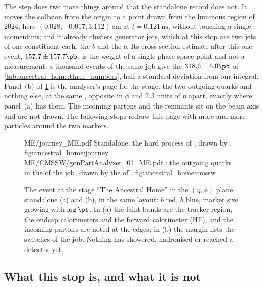 The  step does two more things around \PYTHIA that the
standalone record does not. It moves the collision from the origin to a
point drawn from the luminous region of 2024, here
$(0.028,-0.017,3.112)\,\mathrm{cm}$ at $t=0.121\,\mathrm{ns}$, without
touching a single momentum; and it already clusters generator jets, which
at this stop are two jets of one constituent each, the $b$ and the
$\bar b$. Its cross-section estimate after this one event,
$157.7\pm157.7\pb$, is the weight of a single phase-space point and not a
measurement; a thousand events of the same job give the $348.6\pm6.0\pb$
of \cref{tab:ancestral_home:three_numbers}, half a standard deviation from
our integral. Panel~(b) of
\cref{fig:ancestral_home:displays} is the analyser's page for the stage:
the two outgoing quarks and nothing else, at the same \pt, opposite in
$\phi$ and $2.3$ units of $\eta$ apart, exactly where panel~(a) has them.
The incoming partons and the remnants sit on the beam axis and are not
drawn. The following stops redraw this page with more and more particles
around the two markers.

\begin{figure}[p]\centering
\ledgerdisplays
  {ME/journey_ME.pdf}
  {Standalone: the hard process of , drawn by .}
  {fig:ancestral_home:journey}
  {ME/CMSSW/genPartAnalyzer_01_ME.pdf}
  {\CMSSW: the outgoing quarks in the  of the  job, drawn by the  of .}
  {fig:ancestral_home:cmssw}
\caption[The hard process in the $(\eta,\phi)$ plane, standalone and
\CMSSW]{The event at the stage ``The Ancestral Home'' in the $(\eta,\phi)$
plane, standalone (a) and \CMSSW (b), in the same layout: $b$ red, $\bar b$
blue, marker size growing with $\log\pt$. In (a) the faint bands are the
tracker region, the endcap calorimeters and the forward calorimeter (HF),
and the incoming partons are noted at the edges; in (b) the margin lists
the switches of the job. Nothing has showered, hadronised or reached a
detector yet.}
\label{fig:ancestral_home:displays}
\end{figure}

\subsection{What this stop is, and what it is not}
\label{sec:ancestral_home:caveats}

